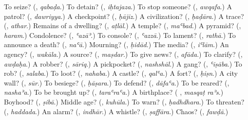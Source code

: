 \begin{tcolorbox}[breakable,colback=teal!4,colframe=teal!35!black,title={Before you move on}]
To seize? (\textbf{}, \emph{qabaḍa}.) To detain? (\textbf{}, \emph{iḥtajaza}.) To stop someone? (\textbf{}, \emph{awqafa}.) A patrol? (\textbf{}, \emph{dawriyya}.) A checkpoint? (\textbf{}, \emph{ḥājiz}.) A civilization? (\textbf{}, \emph{ḥaḍāra}.) A trace? (\textbf{}, \emph{athar}.) Remains of a dwelling? (\textbf{}, \emph{aṭlāl}.) A temple? (\textbf{}, \emph{maʿbad}.) A pyramid? (\textbf{}, \emph{haram}.) Condolence? (\textbf{}, \emph{ʿazāʾ}.) To console? (\textbf{}, \emph{ʿazzā}.) To lament? (\textbf{}, \emph{rathā}.) To announce a death? (\textbf{}, \emph{naʿā}.) Mourning? (\textbf{}, \emph{ḥidād}.) The media? (\textbf{}, \emph{iʿlām}.) An agency? (\textbf{}, \emph{wakāla}.) A source? (\textbf{}, \emph{maṣdar}.) To give news? (\textbf{}, \emph{afāda}.) To clarify? (\textbf{}, \emph{awḍaḥa}.) A robber? (\textbf{}, \emph{sāriq}.) A pickpocket? (\textbf{}, \emph{nashshāl}.) A gang? (\textbf{}, \emph{ʿiṣāba}.) To rob? (\textbf{}, \emph{salaba}.) To loot? (\textbf{}, \emph{nahaba}.) A castle? (\textbf{}, \emph{qalʿa}.) A fort? (\textbf{}, \emph{ḥiṣn}.) A city wall? (\textbf{}, \emph{sūr}.) To besiege? (\textbf{}, \emph{ḥāṣara}.) To defend? (\textbf{}, \emph{dāfaʿa}.) To be reared? (\textbf{}, \emph{nashaʾa}.) To be brought up? (\textbf{}, \emph{taraʿraʿa}.) A birthplace? (\textbf{ }, \emph{masqaṭ raʾs}.) Boyhood? (\textbf{}, \emph{ṣibā}.) Middle age? (\textbf{}, \emph{kuhūla}.) To warn? (\textbf{}, \emph{ḥadhdhara}.) To threaten? (\textbf{}, \emph{haddada}.) An alarm? (\textbf{}, \emph{indhār}.) A whistle? (\textbf{}, \emph{ṣaffāra}.) Chaos? (\textbf{}, \emph{fawḍā}.)
\end{tcolorbox}
